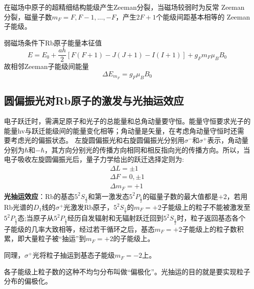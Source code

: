 \documentclass[UTF8]{ctexart}
\begin{document}
\begin{multicols}{2}
在磁场中原子的超精细结构能级产生Zeeman分裂，当磁场较弱时为反常 Zeeman分裂，磁量子数$m_F=F,F-1,...,-F$，产生$2F+1$个能级间距基本相等的 Zeeman子能级。

弱磁场条件下Rb原子能量本征值
\begin{equation}
E=E_{0}+\frac{a h}{2}[F(F+1)-J(J+1)-I(I+1)]+g_{F} m_{F} \mu_{B} B_{0}
\end{equation}
故相邻Zeeman子能级间能量
\begin{equation}
\Delta E_{m_{F}}=g_{F} \mu_{B} B_{0}
\end{equation}

\subsection{圆偏振光对Rb原子的激发与光抽运效应}
电子跃迁时，需满足原子和光子的总能量和总角动量要守恒。能量守恒要求光子的能量hv与跃迁能级间的能量变化相等；角动量是矢量，在考虑角动量守恒时还需要考虑光的偏振状态。
左旋圆偏振光和右旋圆偏振光分别用$\sigma^-$和$\sigma^+$表示，角动量分别为$\hbar$和$-\hbar$，其方向分别光的传播方向相同和相反指向光的传播方向。所以，当电子吸收左旋圆偏振光后，量子力学给出的跃迁选择定则为:
\begin{equation}
\begin{array}{l}{\Delta L=\pm 1} \\ {\Delta F=0, \pm 1} \\ {\Delta m_{F}=+1}\end{array}
\end{equation}
\noindent\textbf{光抽运效应}：Rb的基态$5^2S_{\frac{1}{2}}$和第一激发态$5^2P_{\frac{1}{2}}$的磁量子数的最大值都是$+2$，若用Rb光谱的$D_1$线的$\sigma^+$光激发Rb原子，$5^2S_{\frac{1}{2}}$的$m_F=+2$子能级上的粒子不能被激发至$5^2P_{\frac{1}{2}}$态;当原子从$5^2P_{\frac{1}{2}}$经历自发辐射和无辐射跃迁回到$5^2S_{\frac{1}{2}}$时，粒子返回基态各个子能级的几率大致相等，经过若干循环之后，基态$m_F=+2$子能级上的粒子数积累，即大量粒子被“抽运”到$m_F=+2$的子能级上。

同理，$\sigma^+$光将粒子抽运到基态子能级$m_F=-2$上。

各子能级上粒子数的这种不均匀分布叫做“偏极化”。光抽运的目的就是要实现粒子分布的偏极化。


\end{multicols}
\end{document}
